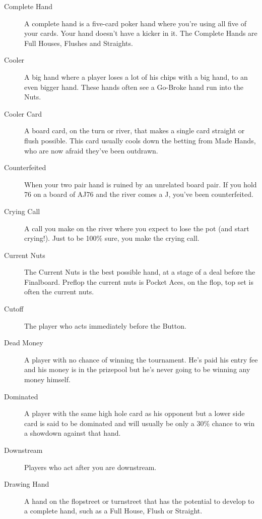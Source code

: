 \begin{description}
\item[Complete Hand] A complete hand is a five-card poker hand where
you're using all five of your cards. Your hand doesn't have a kicker
in it. The Complete Hands are Full Houses, Flushes and Straights.

\item[Cooler] A big hand where a player loses a lot of his chips with
a big hand, to an even bigger hand. These hands often see a Go-Broke
hand run into the Nuts.

\item[Cooler Card] A board card, on the turn or river, that makes a
single card straight or flush possible. This card usually cools down
the betting from Made Hands, who are now afraid they've been outdrawn.

\item[Counterfeited] When your two pair hand is ruined by an unrelated
board pair. If you hold 76 on a board of AJ76 and the river comes a J,
you've been counterfeited.

\item[Crying Call] A call you make on the river where you expect to
lose the pot (and start crying!). Just to be 100\% sure, you make the
crying call.

\item[Current Nuts] The Current Nuts is the best possible hand, at a
stage of a deal before the Finalboard. Preflop the current nuts is
Pocket Aces, on the flop, top set is often the current nuts.

\item[Cutoff] The player who acts immediately before the Button.

\item[Dead Money] A player with no chance of winning the tournament.
He's paid his entry fee and his money is in the prizepool but he's
never going to be winning any money himself.

\item[Dominated] A player with the same high hole card as his opponent
but a lower side card is said to be dominated and will usually be
only a 30\% chance to win a showdown against that hand.

\item[Downstream] Players who act after you are downstream.

\item[Drawing Hand] A hand on the flopstreet or turnstreet that has
the potential to develop to a complete hand, such as a Full House,
Flush or Straight.


\end{description}
